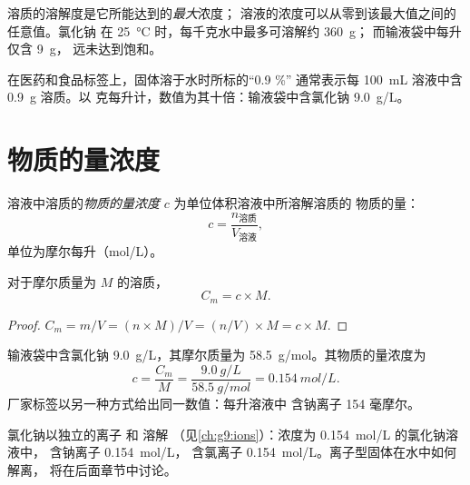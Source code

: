 \begin{remark}[浓度不等于溶解度]\label{rem:g10:concentration-and-dilution:not-solubility}
溶质的溶解度是它所能达到的\emph{最大}浓度；
溶液的浓度可以从零到该最大值之间的任意值。氯化钠
在 \qty{25}{\celsius} 时，每千克水中最多可溶解约 \qty{360}{g}；
而输液袋中每升仅含 \qty{9}{g}，
远未达到饱和。
\end{remark}

\begin{remark}[标签上的百分数]\label{rem:g10:concentration-and-dilution:percent}
在医药和食品标签上，固体溶于水时所标的“0.9 \%”
通常表示每 \qty{100}{mL} 溶液中含 \qty{0.9}{g} 溶质。以
克每升计，数值为其十倍：输液袋中含氯化钠
\qty{9.0}{g/L}。
\end{remark}

\section{物质的量浓度}

\begin{definition}[物质的量浓度]\label{def:g10:concentration-and-dilution:molar-concentration}
溶液中溶质的\emph{物质的量浓度} $c$
为单位体积溶液中所溶解溶质的
物质的量：
\[
  c = \frac{n_{\text{溶质}}}{V_{\text{溶液}}},
\]
单位为摩尔每升（\si{mol/L}）。
\end{definition}

\begin{proposition}[两种浓度之间的换算]\label{prop:g10:concentration-and-dilution:link}
对于摩尔质量为 $M$ 的溶质，
\[
  C_m = c \times M .
\]
\end{proposition}

\begin{proof}
$C_m = m / V = (n \times M) / V = (n / V) \times M = c \times M$.
\end{proof}

\begin{example}[以摩尔计的输液袋]\label{ex:g10:concentration-and-dilution:drip}
输液袋中含氯化钠 \qty{9.0}{g/L}，其摩尔质量为
\qty{58.5}{g/mol}。其物质的量浓度为
\[
  c = \frac{C_m}{M} = \frac{\qty{9.0}{g/L}}{\qty{58.5}{g/mol}}
    = \qty{0.154}{mol/L}.
\]
厂家标签以另一种方式给出同一数值：每升溶液中
含钠离子 154 毫摩尔。
\end{example}

\begin{remark}[溶液中的离子]\label{rem:g10:concentration-and-dilution:ions}
氯化钠以独立的离子  和  溶解
（见\cref{ch:g9:ions}）：浓度为 \qty{0.154}{mol/L} 的氯化钠溶液中，
含钠离子 \qty{0.154}{mol/L}，
含氯离子 \qty{0.154}{mol/L}。离子型固体在水中如何解离，
将在后面章节中讨论。
\end{remark}

